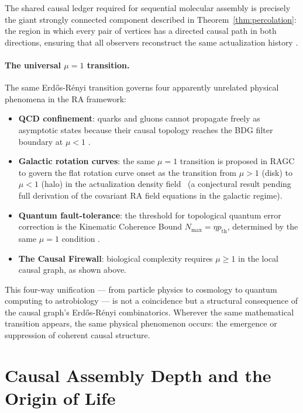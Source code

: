 \documentclass[11pt,a4paper]{article}
\theoremstyle{plain}
\theoremstyle{definition}
\theoremstyle{remark}
\begin{document}
The shared causal ledger required for sequential molecular assembly is
precisely the giant strongly connected component described in
Theorem~\ref{thm:percolation}: the region in which every pair of vertices
has a directed causal path in both directions, ensuring that all observers
reconstruct the same actualization history \citep{Sandeman2026RACI}.

\paragraph{The universal $\mu = 1$ transition.}
The same Erd\H{o}s-R\'{e}nyi transition governs four apparently unrelated
physical phenomena in the RA framework:
\begin{itemize}[noitemsep]
  \item \textbf{QCD confinement}: quarks and gluons cannot propagate freely
    as asymptotic states because their causal topology reaches the BDG
    filter boundary at $\mu < 1$ \citep{Sandeman2026RATM}.
  \item \textbf{Galactic rotation curves}: the same $\mu = 1$ transition is
    proposed in RAGC to govern the flat rotation curve onset as the transition
    from $\mu > 1$ (disk) to $\mu < 1$ (halo) in the actualization density
    field~\citep{Sandeman2026RAGC} (a conjectural result pending full derivation
    of the covariant RA field equations in the galactic regime).
  \item \textbf{Quantum fault-tolerance}: the threshold for topological
    quantum error correction is the Kinematic Coherence Bound
    $N_{\max} = \eta p_{\mathrm{th}}$, determined by the same $\mu = 1$
    condition \citep{Sandeman2026RAQI}.
  \item \textbf{The Causal Firewall}: biological complexity requires
    $\mu \geq 1$ in the local causal graph, as shown above.
\end{itemize}
This four-way unification --- from particle physics to cosmology to quantum
computing to astrobiology --- is not a coincidence but a structural
consequence of the causal graph's Erd\H{o}s-R\'{e}nyi combinatorics.
Wherever the same mathematical transition appears, the same physical
phenomenon occurs: the emergence or suppression of coherent causal structure.

\section{Causal Assembly Depth and the Origin of Life}
\label{sec:ara}
\end{document}
